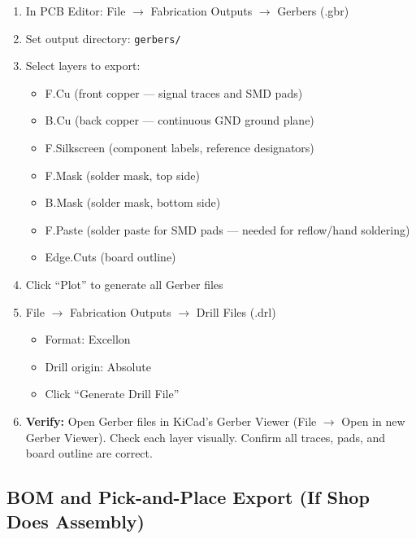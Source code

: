 \documentclass[a4paper,11pt]{article}
\renewcommand*{\,}{ }%
\begin{document}
\begin{enumerate}
    \item In PCB Editor: File $\rightarrow$ Fabrication Outputs $\rightarrow$ Gerbers (.gbr)
    \item Set output directory: \texttt{gerbers/}
    \item Select layers to export:
    \begin{itemize}[noitemsep]
        \item F.Cu (front copper --- signal traces and SMD pads)
        \item B.Cu (back copper --- continuous GND ground plane)
        \item F.Silkscreen (component labels, reference designators)
        \item F.Mask (solder mask, top side)
        \item B.Mask (solder mask, bottom side)
        \item F.Paste (solder paste for SMD pads --- needed for reflow/hand soldering)
        \item Edge.Cuts (board outline)
    \end{itemize}
    \item Click ``Plot'' to generate all Gerber files
    \item File $\rightarrow$ Fabrication Outputs $\rightarrow$ Drill Files (.drl)
    \begin{itemize}[noitemsep]
        \item Format: Excellon
        \item Drill origin: Absolute
        \item Click ``Generate Drill File''
    \end{itemize}
    \item \textbf{Verify:} Open Gerber files in KiCad's Gerber Viewer (File $\rightarrow$ Open in new Gerber Viewer). Check each layer visually. Confirm all traces, pads, and board outline are correct.
\end{enumerate}

\subsection{BOM and Pick-and-Place Export (If Shop Does Assembly)}
\end{document}

